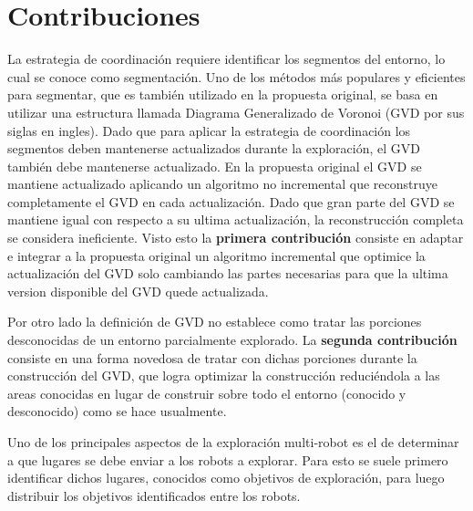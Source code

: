 \section{Contribuciones}\label{sec:cont}

La estrategia de coordinación requiere identificar los segmentos del entorno,
lo cual se conoce como segmentación. Uno de los métodos más populares y
eficientes para segmentar, que es también utilizado en la propuesta original, se
basa en utilizar una estructura llamada Diagrama Generalizado de Voronoi (GVD
por sus siglas en ingles). Dado que para aplicar la estrategia de coordinación
los segmentos deben mantenerse actualizados durante la exploración, el GVD
también debe mantenerse actualizado. En la propuesta original el GVD se
mantiene actualizado aplicando un algoritmo no incremental que
reconstruye completamente el GVD en cada actualización. Dado que gran parte del GVD se
mantiene igual con respecto a su ultima actualización, la reconstrucción
completa se considera ineficiente. Visto esto la \textbf{primera contribución}
consiste en adaptar e integrar a la propuesta original un algoritmo incremental
que optimice la actualización del GVD solo cambiando las partes necesarias para
que la ultima version disponible del GVD quede actualizada. 


Por otro lado la definición de GVD no establece como tratar las porciones
desconocidas de un entorno parcialmente explorado. La \textbf{segunda contribución}
consiste en una forma novedosa de tratar con dichas porciones durante la
construcción del GVD, que logra optimizar la construcción reduciéndola a las areas
conocidas en lugar de construir sobre todo el entorno (conocido y desconocido)
como se hace usualmente.

Uno de los principales aspectos de la exploración multi-robot es el de
determinar a que lugares se debe enviar a los robots a explorar. Para esto se
suele primero identificar dichos lugares, conocidos como objetivos de
exploración, para luego distribuir los objetivos identificados entre los
robots.

